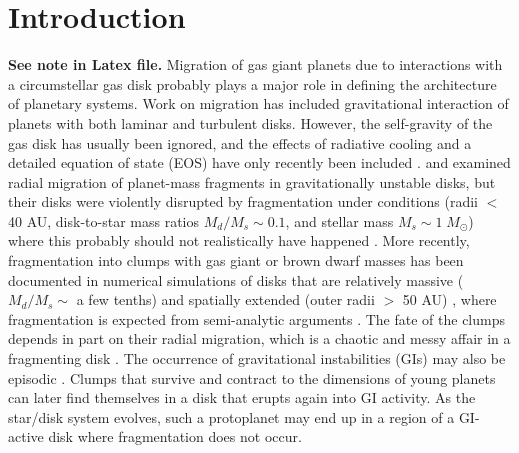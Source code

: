 \documentclass[12pt,manuscript,authoryear]{aastex}
\begin{document}

\label{firstpage}

\section{Introduction}

{\bf See note in Latex file.} 
Migration of gas giant planets due to interactions with a circumstellar gas disk probably plays a major role in defining the architecture of planetary systems. Work on migration \citep[see review by][]{papaloizou2007} has included gravitational interaction of planets with both laminar and turbulent disks. However,  the self-gravity of the gas disk has usually been ignored, and the effects of radiative cooling and a detailed equation of state (EOS) have only recently been included \citep[e.g.,][]{paardekooper2006,paardekooper2010,paardekooper2010b}. \citet{boss2005} and \citet{mayer2004} examined radial migration of planet-mass fragments in gravitationally unstable disks, but their disks were violently disrupted by fragmentation under conditions (radii $<$ 40 AU, disk-to-star mass ratios $M_d/M_s \sim 0.1$, and stellar mass $M_s \sim 1\;M_{\odot}$) where this probably should not realistically have happened \citep{rafikov2005,rafikov2007,boley2006,boley2007b,boley2008,forgan2009,cai2010}. More recently, fragmentation into clumps with gas giant or brown dwarf masses has been documented in numerical simulations of disks that are relatively massive ($M_d/M_s \sim$ a few tenths) and spatially extended (outer radii $>$ 50 AU) \citep{krumholz2007,stamatellos2007,stamatellos2009,boley2009,boley2010}, where fragmentation is expected from semi-analytic arguments \citep[e.g.,][]{clarke2009,rafikov2009,dodson2009}. The fate of the clumps depends in part on their radial migration, which is a chaotic and messy affair in a fragmenting disk \citep[e.g.,][]{boley2009,boley2010,vorobyov2010,boleydurisen2010}. The occurrence of gravitational instabilities (GIs) may also be episodic \citep[e.g.,][]{vorobyov2006,vorobyov2010b,zhu2010}. Clumps that survive and contract to the dimensions of young planets can later find themselves in a disk that erupts again into GI activity. As the star/disk system evolves, such a protoplanet may end up in a region of a GI-active disk where fragmentation does not occur.
\end{document}

